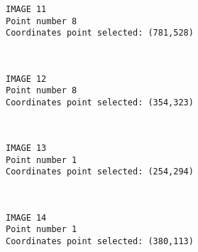 \documentclass[11pt]{article}
\begin{document}
    \begin{Verbatim}[commandchars=\\\{\}]
IMAGE 11
Point number 8
Coordinates point selected: (781,528)

    \end{Verbatim}

    \begin{center}
    \end{center}
    { \hspace*{\fill} \\}
    
    \begin{Verbatim}[commandchars=\\\{\}]
IMAGE 12
Point number 8
Coordinates point selected: (354,323)

    \end{Verbatim}

    \begin{center}
    \end{center}
    { \hspace*{\fill} \\}
    
    \begin{Verbatim}[commandchars=\\\{\}]
IMAGE 13
Point number 1
Coordinates point selected: (254,294)

    \end{Verbatim}

    \begin{center}
    \end{center}
    { \hspace*{\fill} \\}
    
    \begin{Verbatim}[commandchars=\\\{\}]
IMAGE 14
Point number 1
Coordinates point selected: (380,113)

    \end{Verbatim}

    \begin{center}
    \end{center}
    { \hspace*{\fill} \\}
    
\end{document}
